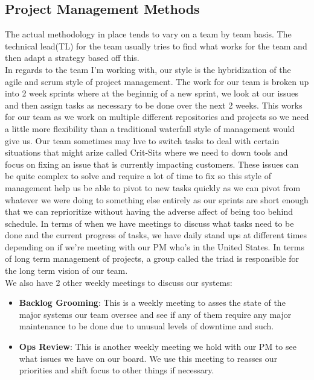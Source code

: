\documentclass[11pt]{article} %
\begin{document}
\subsection{Project Management Methods}
The actual methodology in place tends to vary on a team by team basis. The technical lead(TL) for the team usually tries to find what works for the team and then adapt a strategy based off this. 
\\ In regards to the team I'm working with, our style is the hybridization of the agile and scrum style of project management. The work for our team is broken up into 2 week sprints where at the beginnig of a new sprint, we look at our issues and then assign tasks as necessary to be done over the next 2 weeks. This works for our team as we work on multiple different repositories and projects so we need a little more flexibility than a traditional waterfall style of management would give us. Our team sometimes may hve to switch tasks to deal with certain situations that might arize called Crit-Sits where we need to down tools and focus on fixing an issue that is currently impacting customers. These issues can be quite complex to solve and require a lot of time to fix so this style of management help us be able to pivot to new tasks quickly as we can pivot from whatever we were doing to something else entirely as our sprints are short enough that we can reprioritize without having the adverse affect of being too behind schedule. In terms of when we have meetings to discuss what tasks need to be done and the current progress of tasks, we have daily stand ups at different times depending on if we're meeting with our PM who's in the United States. In terms of long term management of projects, a group called the triad is responsible for the long term vision of our team.
\\ We also have 2 other weekly meetings to discuss our systems: \begin{itemize} \item \textbf{Backlog Grooming}: This is a weekly meeting to asses the state of the major systems our team oversee and see if any of them require any major maintenance to be done due to unusual levels of downtime and such. \item \textbf{Ops Review}: This is another weekly meeting we hold with our PM to see what issues we have on our board. We use this meeting to reasses our priorities and shift focus to other things if necessary. \\ \end{itemize} 
\end{document}
